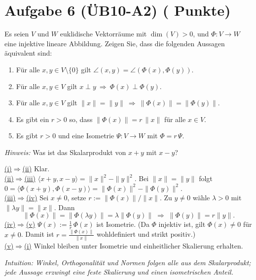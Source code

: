 \documentclass[11pt, a4paper]{article}
\newcommand{\aufgabe}[2]{%
  \section*{\Large\bfseries Aufgabe #1%
  \if\relax\detokenize{#2}\relax\else \hfill\normalfont\normalsize(#2 Punkte)\fi}%
  \vspace{-1.5ex}
}
\begin{document}
\aufgabe{6 (ÜB10-A2)}{}
Es seien $V$ und $W$ euklidische Vektorräume mit $\dim(V)>0$, und $\Phi:V\to W$ eine injektive lineare Abbildung. Zeigen Sie, dass die folgenden Aussagen äquivalent sind:
\begin{enumerate}
  \item Für alle $x,y\in V\setminus\{0\}$ gilt $\angle(x,y)=\angle(\Phi(x),\Phi(y))$.
  \item Für alle $x,y\in V$ gilt $x\perp y\ \Rightarrow\ \Phi(x)\perp \Phi(y)$.
  \item Für alle $x,y\in V$ gilt $\|x\|=\|y\|\ \Rightarrow\ \|\Phi(x)\|=\|\Phi(y)\|$.
  \item Es gibt ein $r>0$ so, dass $\|\Phi(x)\|=r\,\|x\|$ für alle $x\in V$.
  \item Es gibt $r>0$ und eine Isometrie $\Psi:V\to W$ mit $\Phi=r\,\Psi$.
\end{enumerate}
\emph{Hinweis:} Was ist das Skalarprodukt von $x+y$ mit $x-y$?
\begin{framed}
\underline{(i)$\Rightarrow$(ii)} Klar. \\
\underline{(ii)$\Rightarrow$(iii)} $\langle x+y,x-y\rangle=\|x\|^2-\|y\|^2$.
Bei $\|x\|=\|y\|$ folgt $0=\langle\Phi(x+y),\Phi(x-y)\rangle
=\|\Phi(x)\|^2-\|\Phi(y)\|^2$. \\
\underline{(iii)$\Rightarrow$(iv)} Sei $x\neq 0$, setze $r:=\|\Phi(x)\|/\|x\|$.
Zu $y\neq 0$ wähle $\lambda>0$ mit $\|\lambda y\|=\|x\|$. Dann
\[
\|\Phi(x)\|=\|\Phi(\lambda y)\|=\lambda\|\Phi(y)\|\;\Rightarrow\;
\|\Phi(y)\|=r\|y\|.
\]
\underline{(iv)$\Rightarrow$(v)} $\Psi(x):=\tfrac1r\,\Phi(x)$ ist Isometrie. (Da $\Phi$ injektiv ist, gilt $\Phi(x)\neq 0$ für $x\neq 0$. 
Damit ist $r=\frac{\|\Phi(x)\|}{\|x\|}$ wohldefiniert und strikt positiv.) \\
\underline{(v)$\Rightarrow$(i)} Winkel bleiben unter Isometrie und einheitlicher Skalierung erhalten.

\medskip\noindent\textit{Intuition: Winkel, Orthogonalität und Normen folgen alle aus dem Skalarprodukt; jede Aussage erzwingt eine feste Skalierung und einen isometrischen Anteil.}
\end{framed}
\end{document}
